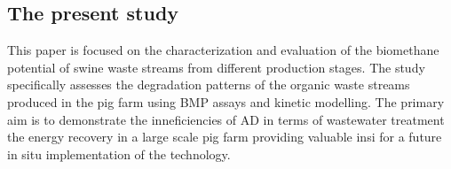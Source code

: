 \subsection{The present study}
This paper is focused on the characterization and evaluation of the biomethane potential of swine waste streams from different production stages. The study specifically assesses the degradation patterns of the organic waste streams produced in the pig farm using BMP assays and kinetic modelling. The primary aim is to demonstrate the inneficiencies of AD in terms of wastewater treatment the energy recovery in a large scale pig farm providing valuable insi for a future in situ implementation of the technology.